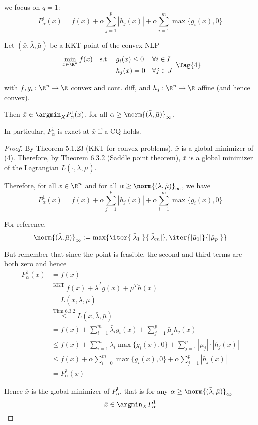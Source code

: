 we focus on $q=1$:
$$
  P_\alpha^1(x)=f(x)+\alpha\sum_{j=1}^p|h_j(x)| + \alpha\sum_{i=1}^m\max\{g_i(x),0\}
$$


Let $(\bar x,\bar\lambda,\bar\mu)$ be a KKT point of the convex NLP
\begin{equation*}
  \NlpStdForm\Tag{4}
\end{equation*}

with $f,g_i:\R^n\to\R$ convex and cont. diff, and $h_j:\R^n\to\R$ affine (and
hence convex).

Then $\bar x\in\argmin_XP_\alpha^1(x)$, for all
$\alpha\geq\norm{(\bar\lambda,\bar\mu)}_\infty$.

In particular, $P_\alpha^1$ is exact at $\bar x$ if a CQ holds.

\begin{proof}
  By Theorem 5.1.23 (KKT for convex problems), $\bar x$ is a global minimizer of
  (4). Therefore, by Theorem 6.3.2 (Saddle point theorem), $\bar x$ is a global
  minimizer of the Lagrangian $L(\cdot,\bar\lambda,\bar\mu)$.

  Therefore, for all $x\in\R^n$ and for all
  $\alpha\geq\norm{(\bar\lambda,\bar\mu)}_\infty$, we have
  $$
    P_\alpha^1(\bar x)=f(\bar x)+\alpha\sum_{j=1}^p|h_j(\bar x)| + \alpha\sum_{i=1}^m\max\{g_i(\bar x),0\}
  $$

  For reference,
  $$
    \norm{(\bar\lambda,\bar\mu)}_\infty:=\max\{
    \iter{|\bar\lambda_1|}{|\bar\lambda_m|},
    \iter{|\bar\mu_1|}{|\bar\mu_p|}
    \}
  $$

  But remember that since the point is feasible, the second and third terms are
  both zero and hence
  \begin{align*}
    P_\alpha^1(\bar x)
     & =f(\bar x)                                                                               \\
     & \stackrel{\text{KKT}}{=}f(\bar x)+\bar\lambda^Tg(\bar x)+\bar\mu^Th(\bar x)              \\
     & = L(\bar x,\bar\lambda,\bar\mu)                                                          \\
     & \stackrel{\text{Thm 6.3.2}}{\leq} L(x,\bar\lambda,\bar\mu)                               \\
     & = f(x)+\sum_{i=1}^m\bar\lambda_ig_i(x)+\sum_{j=1}^p\bar\mu_jh_j(x)                       \\
     & \leq f(x)+\sum_{i=1}^m\bar\lambda_i\max\{g_i(x),0\}+\sum_{j=1}^p|\bar\mu_j|\cdot|h_j(x)| \\
     & \leq f(x)+\alpha\sum_{i=0}^m\max\{g_i(x),0\}+\alpha\sum_{j=1}^p|h_j(x)|                  \\
     & = P_\alpha^1(x)
  \end{align*}

  Hence $\bar x$ is the global minimizer of $P_\alpha^1$, that is for any
  $\alpha\geq\norm{(\bar\lambda,\bar\mu)}_\infty$
  $$
    \bar x\in\argmin_XP_\alpha^1
  $$
\end{proof}

